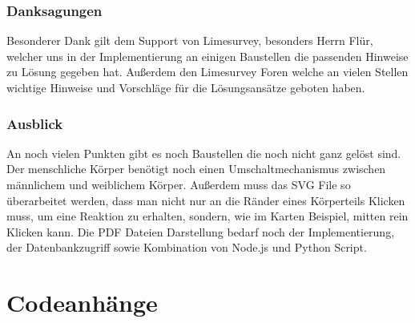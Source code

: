 \subsubsection{Danksagungen}
Besonderer Dank gilt dem Support von Limesurvey, besonders Herrn Flür, welcher uns in der Implementierung an einigen Baustellen die passenden Hinweise zu Lösung gegeben hat. Außerdem den Limesurvey Foren welche an vielen Stellen wichtige Hinweise und Vorschläge für die Lösungsansätze geboten haben.
\subsubsection{Ausblick}
An noch vielen Punkten gibt es noch Baustellen die noch nicht ganz gelöst sind. Der menschliche Körper benötigt noch einen Umschaltmechanismus zwischen männlichem und weiblichem Körper. Außerdem muss das SVG File so überarbeitet werden, dass man nicht nur an die Ränder eines Körperteils Klicken muss, um eine Reaktion zu erhalten, sondern, wie im Karten Beispiel, mitten rein Klicken kann. Die PDF Dateien Darstellung bedarf noch der Implementierung, der Datenbankzugriff sowie Kombination von Node.js und Python Script.

\newpage
\section{Codeanhänge}
\lstset{basicstyle=\small}




\newpage


